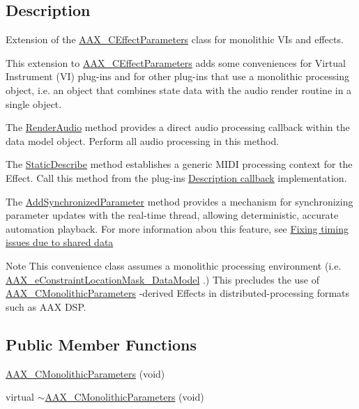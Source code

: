 \subsection{Description}
Extension of the \hyperlink{a00018}{A\+A\+X\+\_\+\+C\+Effect\+Parameters} class for monolithic V\+Is and effects. 

This extension to \hyperlink{a00018}{A\+A\+X\+\_\+\+C\+Effect\+Parameters} adds some conveniences for Virtual Instrument (V\+I) plug-\/ins and for other plug-\/ins that use a monolithic processing object, i.\+e. an object that combines state data with the audio render routine in a single object.

\begin{DoxyItemize}
\item The \hyperlink{a00026_a04f2f73d70ea28c17747c68fc3a20fc8}{Render\+Audio} method provides a direct audio processing callback within the data model object. Perform all audio processing in this method. \item The \hyperlink{a00026_a69f9b80a70ecc6b7b2a7eec372d2502a}{Static\+Describe} method establishes a generic M\+I\+D\+I processing context for the Effect. Call this method from the plug-\/in\textquotesingle{}s \hyperlink{a00326}{Description callback} implementation. \item The \hyperlink{a00026_a1b23573e8aa3f8e64c61813b721559c2}{Add\+Synchronized\+Parameter} method provides a mechanism for synchronizing parameter updates with the real-\/time thread, allowing deterministic, accurate automation playback. For more information abou this feature, see \hyperlink{a00351_parameterUpdateTiming_sharedData}{Fixing timing issues due to shared data}\end{DoxyItemize}
\begin{DoxyNote}{Note}
This convenience class assumes a monolithic processing environment (i.\+e. \hyperlink{a00206_a0c5d795c1fd021c5b9b541febc34601aa027df08c137702400a92719828bea44b}{A\+A\+X\+\_\+e\+Constraint\+Location\+Mask\+\_\+\+Data\+Model} .) This precludes the use of \hyperlink{a00026}{A\+A\+X\+\_\+\+C\+Monolithic\+Parameters} -\/derived Effects in distributed-\/processing formats such as A\+A\+X D\+S\+P. 
\end{DoxyNote}
\subsection*{Public Member Functions}
\begin{DoxyCompactItemize}
\item 
\hyperlink{a00026_a392d2cfd3a182653ab3116e8ee43bf55}{A\+A\+X\+\_\+\+C\+Monolithic\+Parameters} (void)
\item 
virtual \hyperlink{a00026_a87d85a4a64f0b6488eb7509506b58207}{$\sim$\+A\+A\+X\+\_\+\+C\+Monolithic\+Parameters} (void)
\end{DoxyCompactItemize}
